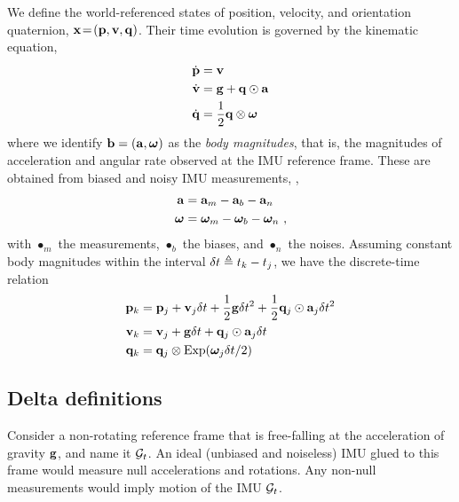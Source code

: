 We define the world-referenced states of position, velocity, and orientation quaternion, ${\bf x}\!=\!({\bf p},{\bf v},{\bf q})$. 
Their time evolution is governed by the kinematic equation,
%
\begin{align}\label{equ:cont_basic}
\begin{split}
\dot{{\bf p}} &= {\bf v} \\
\dot{{\bf v}} &= {\bf g} + {\bf q}\odot{\bf a} \\
\dot{{\bf q}} &= \frac12{\bf q}\otimes{{\bm \omega}} 
\end{split}
\end{align}
%
where we identify ${\bf b}=({\bf a},{{\bm \omega}})$ as the \emph{body magnitudes}, that is, the magnitudes of acceleration and angular rate observed at the IMU reference frame. These are obtained from biased and noisy IMU measurements, \ie,
%
\begin{align}\label{equ:body}
\begin{split}
{\bf a} &= {\bf a}_m - {{\bf a}_b} - {\bf a}_n \\
{{\bm \omega}} &= {{\bm \omega}}_m - {{{\bm \omega}}_b} - {{\bm \omega}}_n 
~,
\end{split}
\end{align}
%
with $\bullet_m$ the measurements, $\bullet_b$ the biases, and $\bullet_n$ the noises.
Assuming constant body magnitudes within the interval $\delta t\triangleq t_k-t_j$, we have the discrete-time relation
%
\begin{align}\label{equ:g_second_order_integration}
\begin{split}
{\bf p}_{k} &= {\bf p}_j + {\bf v}_j\delta t  + \frac12{\bf g}\delta t^2 + \frac12{\bf q}_j\odot{\bf a}_j\delta t^2 \\
{\bf v}_{k} &= {\bf v}_j + {\bf g}\delta t + {\bf q}_j\odot{\bf a}_j\delta t \\
{\bf q}_{k} &= {\bf q}_j\otimes\operatorname*{Exp}({{\bm \omega}}_j\delta t/2) 
\end{split}
\end{align}


\subsection{Delta definitions}

Consider a non-rotating reference frame that is free-falling at the acceleration of gravity ${\bf g}$, and name it $\mathcal{G}_t$. 
An ideal (unbiased and noiseless) IMU glued to this frame would measure null accelerations and rotations. 
Any non-null measurements would imply motion of the IMU \wrt  $\mathcal{G}_t$.


